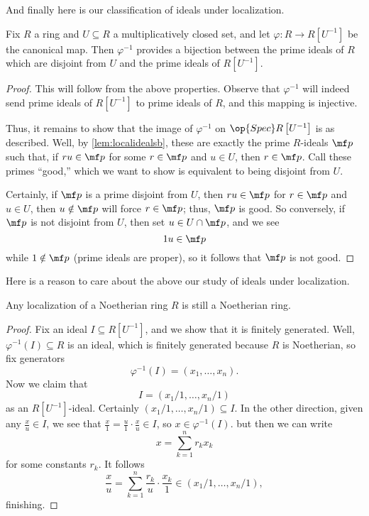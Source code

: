 And finally here is our classification of ideals under localization.
\begin{theorem} \label{thm:localizedprimes}
	Fix $R$ a ring and $U\subseteq R$ a multiplicatively closed set, and let $\varphi:R\to R\left[U^{-1}\right]$ be the canonical map. Then $\varphi^{-1}$ provides a bijection between the prime ideals of $R$ which are disjoint from $U$ and the prime ideals of $R\left[U^{-1}\right]$.
\end{theorem}
\begin{proof}
	This will follow from the above properties. Observe that $\varphi^{-1}$ will indeed send prime ideals of $R\left[U^{-1}\right]$ to prime ideals of $R$, and this mapping is injective.

	Thus, it remains to show that the image of $\varphi^{-1}$ on $\op{Spec}R\left[U^{-1}\right]$ is as described. Well, by \autoref{lem:localidealsb}, these are exactly the prime $R$-ideals $\mf p$ such that, if $ru\in \mf p$ for some $r\in\mf p$ and $u\in U$, then $r\in\mf p$. Call these primes ``good,'' which we want to show is equivalent to being disjoint from $U$.

	Certainly, if $\mf p$ is a prime disjoint from $U$, then $ru\in\mf p$ for $r\in\mf p$ and $u\in U$, then $u\notin\mf p$ will force $r\in\mf p$; thus, $\mf p$ is good. So conversely, if $\mf p$ is not disjoint from $U$, then set $u\in U\cap\mf p$, and we see
	\[1u\in\mf p\]
	while $1\notin\mf p$ (prime ideals are proper), so it follows that $\mf p$ is not good.
\end{proof}
Here is a reason to care about the above our study of ideals under localization.
\begin{corollary}
	Any localization of a Noetherian ring $R$ is still a Noetherian ring.
\end{corollary}
\begin{proof}
	Fix an ideal $I\subseteq R\left[U^{-1}\right]$, and we show that it is finitely generated. Well, $\varphi^{-1}(I)\subseteq R$ is an ideal, which is finitely generated because $R$ is Noetherian, so fix generators
	\[\varphi^{-1}(I)=(x_1,\ldots,x_n).\]
	Now we claim that
	\[I=(x_1/1,\ldots,x_n/1)\]
	as an $R\left[U^{-1}\right]$-ideal. Certainly $(x_1/1,\ldots,x_n/1)\subseteq I$. In the other direction, given any $\frac xu\in I$, we see that $\frac x1=\frac u1\cdot\frac xu\in I$, so $x\in\varphi^{-1}(I)$. but then we can write
	\[x=\sum_{k=1}^nr_kx_k\]
	for some constants $r_k$. It follows
	\[\frac xu=\sum_{k=1}^n\frac{r_k}u\cdot\frac{x_k}1\in(x_1/1,\ldots,x_n/1),\]
	finishing.
\end{proof}

